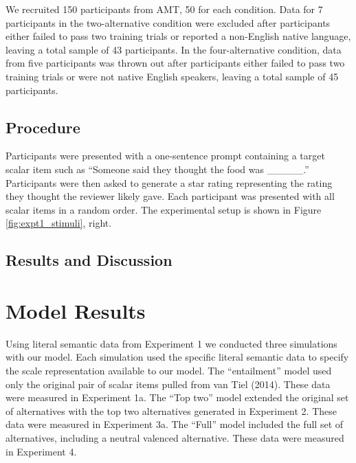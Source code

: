 \documentclass[10pt, letterpaper]{article}
\begin{document}
We recruited 150 participants from AMT, 50 for each condition. Data for
7 participants in the two-alternative condition were excluded after
participants either failed to pass two training trials or reported a
non-English native language, leaving a total sample of 43 participants.
In the four-alternative condition, data from five participants was
thrown out after participants either failed to pass two training trials
or were not native English speakers, leaving a total sample of 45
participants.

\subsection{Procedure}\label{procedure}

Participants were presented with a one-sentence prompt containing a
target scalar item such as ``Someone said they thought the food was
\_\_\_\_\_.'' Participants were then asked to generate a star rating
representing the rating they thought the reviewer likely gave. Each
participant was presented with all scalar items in a random order. The
experimental setup is shown in Figure \ref{fig:expt1_stimuli}, right.

\subsection{Results and Discussion}\label{results-and-discussion-2}

\section{Model Results}\label{model-results}

Using literal semantic data from Experiment 1 we conducted three
simulations with our model. Each simulation used the specific literal
semantic data to specify the scale representation available to our
model. The ``entailment'' model used only the original pair of scalar
items pulled from van Tiel (2014). These data were measured in
Experiment 1a. The ``Top two'' model extended the original set of
alternatives with the top two alternatives generated in Experiment 2.
These data were measured in Experiment 3a. The ``Full'' model included
the full set of alternatives, including a neutral valenced alternative.
These data were measured in Experiment 4.
\end{document}
